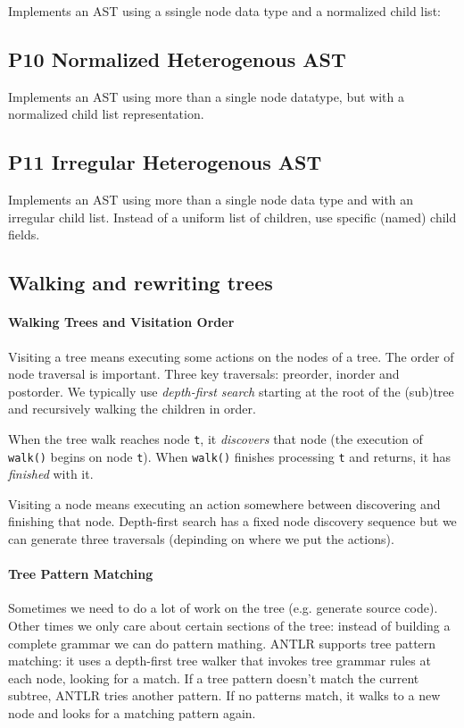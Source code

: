 Implements an AST using a ssingle node data type and a normalized child list:


\subsection{P10 Normalized Heterogenous AST}

Implements an AST using more than a single node datatype,
but with a normalized child list representation.


\subsection{P11 Irregular Heterogenous AST}

Implements an AST using more than a single node data type
and with an irregular child list.
Instead of a uniform list of children, use specific (named) child fields.


\subsection{Walking and rewriting trees}

\paragraph{Walking Trees and Visitation Order}
Visiting a tree means executing some actions on the nodes of a tree.
The order of node traversal is important.
Three key traversals: preorder, inorder and postorder.
We typically use \emph{depth-first search} starting
at the root of the (sub)tree and recursively walking the children in order.

When the tree walk reaches node \verb=t=, it \emph{discovers} that node
(the execution of \verb=walk()= begins on node \verb=t=).
When \verb=walk()= finishes processing \verb=t= and returns,
it has \emph{finished} with it.

Visiting a node means executing an action
somewhere between discovering and finishing that node.
Depth-first search has a fixed node discovery sequence
but we can generate three traversals (depinding on where we put the actions).

\paragraph{Tree Pattern Matching}
Sometimes we need to do a lot of work on the tree (e.g. generate source code).
Other times we only care about certain sections of the tree:
instead of building a complete grammar we can do pattern mathing.
ANTLR supports tree pattern matching:
it uses a depth-first tree walker that invokes tree grammar rules at each node,
looking for a match.
If a tree pattern doesn't match the current subtree,
ANTLR tries another pattern.
If no patterns match,
it walks to a new node and looks for a matching pattern again.

